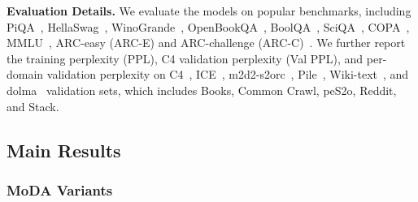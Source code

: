 \documentclass[]{bytedance_seed}
\newcommand{\myPara}[1]{\vspace{.05in}\noindent\textbf{#1.}}
\newcommand{\name}{MoDA}
\begin{document}
\myPara{Evaluation Details}
We evaluate the models on popular benchmarks, including PiQA~\cite{bisk2020piqa}, HellaSwag~\cite{zellers2019hellaswag}, WinoGrande~\cite{sakaguchi2021winogrande}, OpenBookQA~\cite{mihaylov2018openbookqa}, BoolQA~\cite{clark2019boolq}, SciQA~\cite{auer2023sciqa}, COPA~\cite{roemmele2011copa}, MMLU~\cite{hendrycks2020mmlu}, ARC-easy (ARC-E) and ARC-challenge (ARC-C)~\cite{clark2018arc}.
We further report the training perplexity (PPL), C4 validation perplexity (Val PPL), and per-domain validation perplexity on C4~\cite{raffel2020c4}, ICE~\cite{olmo2024olmo2}, m2d2-s2orc~\cite{lo2020s2orc}, Pile~\cite{gao2020pile}, Wiki-text~\cite{olmo2024olmo2}, and dolma~\cite{soldaini2024dolma} validation sets, which includes Books, Common Crawl, peS2o, Reddit, and Stack.

\subsection{Main Results}
\subsubsection{\name{} Variants}
\end{document}
